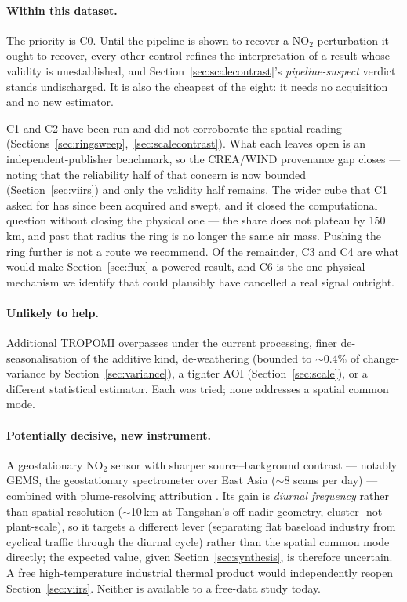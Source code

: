 \documentclass[11pt,a4paper]{article}
\providecommand{\ce}[1]{\ensuremath{\mathrm{#1}}}
\begin{document}
\paragraph{Within this dataset.} The priority is C0. Until the pipeline is shown to recover a
\ce{NO_2} perturbation it ought to recover, every other control refines the interpretation of a
result whose validity is unestablished, and Section~\ref{sec:scalecontrast}'s
\emph{pipeline-suspect} verdict stands undischarged. It is also the cheapest of the eight: it needs
no acquisition and no new estimator.

C1 and C2 have been run and did not corroborate the spatial reading
(Sections~\ref{sec:ringsweep},~\ref{sec:scalecontrast}). What each leaves open is an
independent-publisher benchmark, so the CREA/WIND provenance gap closes --- noting that the
reliability half of that concern is now bounded (Section~\ref{sec:viirs}) and only the validity
half remains. The wider cube that C1 asked for has since been acquired and swept, and it closed the
computational question without closing the physical one --- the share does not plateau by
150\,km, and past that radius the ring is no longer the same air mass. Pushing the ring further is
not a route we recommend. Of the remainder, C3 and C4 are what would make Section~\ref{sec:flux} a
powered result, and C6 is the one physical mechanism we identify that could plausibly have
cancelled a real signal outright.

\paragraph{Unlikely to help.} Additional TROPOMI overpasses under the current processing, finer
de-seasonalisation of the additive kind, de-weathering (bounded to $\sim$0.4\% of change-variance
by Section~\ref{sec:variance}), a tighter AOI (Section~\ref{sec:scale}), or a different
statistical estimator. Each was tried; none addresses a spatial common mode.

\paragraph{Potentially decisive, new instrument.} A geostationary \ce{NO_2} sensor with sharper
source--background contrast --- notably GEMS, the geostationary spectrometer over East Asia
($\sim$8 scans per day) --- combined with plume-resolving attribution
\citep{park_2025_gems_gan,beirle_2023}. Its gain is \emph{diurnal frequency} rather than spatial
resolution ($\sim$10\,km at Tangshan's off-nadir geometry, cluster- not plant-scale), so it
targets a different lever (separating flat baseload industry from cyclical traffic through the
diurnal cycle) rather than the spatial common mode directly; the expected value, given
Section~\ref{sec:synthesis}, is therefore uncertain. A free high-temperature industrial thermal
product would independently reopen Section~\ref{sec:viirs}. Neither is available to a free-data
study today.
\end{document}
